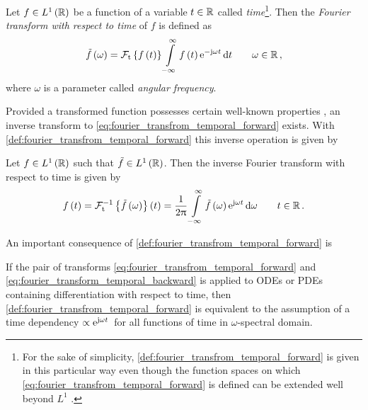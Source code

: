 \begin{definition}
	\label{def:fourier_transfrom_temporal_forward}
	Let $f \in L^1 \left(\mathbb{R}\right)$ be a function of a variable
	$t \in \mathbb{R}$ called \emph{time}\footnote{
		For the sake of simplicity,
		\cref{def:fourier_transfrom_temporal_forward} is given
		in this particular way even though the function spaces
		on which \eqref{eq:fourier_transfrom_temporal_forward} is defined can
		be extended well beyond $L^1$ \cite{grochenig2001,pohl2020}.
	}.
	Then the \emph{Fourier transform with respect to time} of $f$ is defined as 
	\begin{equation}\label{eq:fourier_transfrom_temporal_forward}
		\tilde{f} \left(\omega\right) = 
		\mathcal{F}_{\mathrm{t}} \left\{f \left(t\right)\right\}
		\int\limits_{-\infty}^{\infty}
		f\left( t \right)
		\mathrm{e}^{-\mathrm{j} \omega t}\, 
		\mathrm{d} t
		\qquad \omega \in \mathbb{R}
		\, ,
	\end{equation}
	where $\omega$ is a parameter called \emph{angular frequency}.
\end{definition}
Provided a transformed function possesses certain well-known properties
\cite{grochenig2001,pohl2020}, an inverse transform to
\eqref{eq:fourier_transfrom_temporal_forward} exists.
With \cref{def:fourier_transfrom_temporal_forward}  this inverse operation is
given by
\begin{lemma}
	\label{lemma:fourier_transfrom_temporal_inverse}
	Let $f \in L^1 \left(\mathbb{R}\right)$ such that
	$\tilde{f} \in L^1 \left(\mathbb{R}\right)$. Then the
	inverse Fourier transform with respect to time is given by
	\begin{equation}\label{eq:fourier_transform_temporal_backward}
		f \left(t\right) =
		\mathcal{F}_{\mathrm{t}}^{-1}
		\left\{\tilde{f}\left(\omega\right)\right\} 
		\left( t \right) = 
		\frac{1}{2\uppi}
		\int\limits_{-\infty}^{\infty} 
		\tilde{f} \left( \omega \right)
		\mathrm{e}^{\mathrm{j} \omega t}\, 
		\mathrm{d} \omega 
		\qquad t \in \mathbb{R}
		\, .
	\end{equation}
\end{lemma}

An important consequence of \cref{def:fourier_transfrom_temporal_forward} is

\begin{remark}\label{rem:time_convention}
	If the pair of transforms
	\eqref{eq:fourier_transfrom_temporal_forward} and
	\eqref{eq:fourier_transform_temporal_backward} is applied to \acp{ODE}
	or \acp{PDE} containing differentiation with respect to time, then
	\cref{def:fourier_transfrom_temporal_forward} is equivalent to the
	assumption of a time dependency $\propto\mathrm{e}^{\mathrm{j} \omega t}\,$ for all
	functions of time in $\omega$-spectral domain.
\end{remark}

